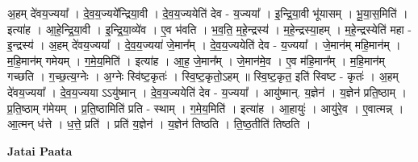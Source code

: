 \documentclass[17pt]{extarticle}
\begin{document}
अ॒हम् दे॑वय॒ज्यया᳚ । दे॒व॒य॒ज्यये᳚न्द्रिया॒वी । दे॒व॒य॒ज्ययेति॑ देव - य॒ज्यया᳚ । इ॒न्द्रि॒या॒वी भू॑यासम् । भू॒या॒स॒मिति॑ । इत्या॑ह । आ॒हे॒न्द्रि॒या॒वी । इ॒न्द्रि॒या॒व्ये॑व । ए॒व भ॑वति । भ॒व॒ति॒ म॒हे॒न्द्रस्य॑ । म॒हे॒न्द्रस्या॒हम् । म॒हे॒न्द्रस्येति॑ महा - इ॒न्द्रस्य॑ । अ॒हम् दे॑वय॒ज्यया᳚ । दे॒व॒य॒ज्यया॑ जे॒मान᳚म् । दे॒व॒य॒ज्ययेति॑ देव - य॒ज्यया᳚ । जे॒मान॑म् महि॒मान॑म् । म॒हि॒मान॑म् गमेयम् । ग॒मे॒य॒मिति॑ । इत्या॑ह । आ॒ह॒ जे॒मान᳚म् । जे॒मान॑मे॒व । ए॒व म॑हि॒मान᳚म् । म॒हि॒मान॑म् गच्छति । ग॒च्छ॒त्य॒ग्नेः । अ॒ग्नेः स्वि॑ष्ट॒कृतः॑ । स्वि॒ष्ट॒कृतो॒ऽहम् ॥ स्वि॒ष्ट॒कृत॒ इति॑ स्विष्ट - कृतः॑ । अ॒हम् दे॑वय॒ज्यया᳚ । दे॒व॒य॒ज्यया ऽऽयु॑ष्मान् । दे॒व॒य॒ज्ययेति॑ देव - य॒ज्यया᳚ । आयु॑ष्मान्. य॒ज्ञेन॑ । य॒ज्ञेन॑ प्रति॒ष्ठाम् । प्र॒ति॒ष्ठाम् ग॑मेयम् । प्र॒ति॒ष्ठामिति॑ प्रति - स्थाम् । ग॒मे॒य॒मिति॑ । इत्या॑ह । आ॒हायुः॑ । आयु॑रे॒व । ए॒वात्मन्न् । आ॒त्मन् ध॑त्ते । ध॒त्ते॒ प्रति॑ । प्रति॑ य॒ज्ञेन॑ । य॒ज्ञेन॑ तिष्ठति । ति॒ष्ठ॒तीति॑ तिष्ठति । \newline

\textbf{Jatai Paata} \newline
\end{document}
